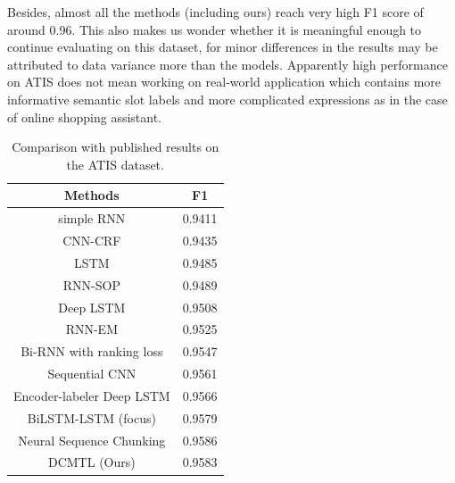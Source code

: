Besides, almost all the methods (including ours) 
reach very high F1 score of around 0.96.
This also makes us wonder
whether it is meaningful enough to continue evaluating on this dataset,
for minor differences in the results may be attributed to data variance
more than the models.
Apparently high performance on ATIS does not 
mean working on real-world application
which contains more informative semantic slot labels and more complicated 
expressions as in the case of online shopping assistant.
\begin{table}[th]
	\centering
	\small
	\caption{Comparison with published results on the ATIS dataset.}
	\begin{tabular}{c|c}
		\toprule
		Methods & F1 \\
		\midrule
		simple RNN \cite{yao2013recurrent} & 0.9411 \\
		CNN-CRF \cite{xu2013convolutional} & 0.9435 \\
		LSTM \cite{yao2014spoken} & 0.9485 \\
		RNN-SOP \cite{liu2015recurrent} & 0.9489 \\
		Deep LSTM \cite{yao2014spoken} & 0.9508 \\
		RNN-EM \cite{peng2015recurrent} & 0.9525 \\
		Bi-RNN with ranking loss \cite{vu2016bi} & 0.9547 \\
		Sequential CNN  \cite{vu2016sequential} & 0.9561 \\
		\midrule
		Encoder-labeler Deep LSTM \cite{kurata2016leveraging} & 0.9566 \\
		BiLSTM-LSTM (focus) \cite{zhu2017encoder} & 0.9579 \\
		Neural Sequence Chunking \cite{zhai2017neural} & 0.9586 \\
		\midrule
		DCMTL (Ours) & 0.9583  \\
		\bottomrule
	\end{tabular}
	\label{tab:eval_ATIS}
\end{table}

